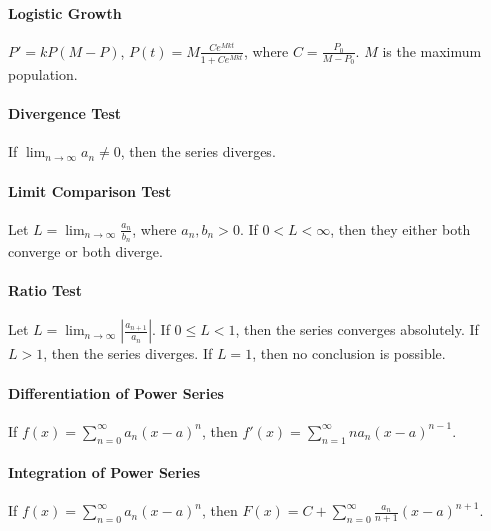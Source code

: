 \documentclass[10pt,letter]{article}
\begin{document}
\paragraph{Logistic Growth}
$P'=kP(M-P)$, $P(t)=M\frac{Ce^{Mkt}}{1+Ce^{Mkt}}$, where $C=\frac{P_0}{M-P_0}$. $M$ is the maximum population. 

\paragraph{Divergence Test}
If $\lim_{n\rightarrow\infty}a_n\neq0$, then the series diverges.

\paragraph{Limit Comparison Test}
Let $L=\lim_{n\rightarrow\infty}\frac{a_n}{b_n}$, where $a_n,b_n>0$. If $0<L<\infty$, then they either both converge or both diverge. 

\paragraph{Ratio Test}
Let $L=\lim_{n\rightarrow\infty}\left|\frac{a_{n+1}}{a_n}\right|$. If $0\leq L<1$, then the series converges absolutely. If $L>1$, then the series diverges. If $L=1$, then no conclusion is possible. 

\paragraph{Differentiation of Power Series}
If $f(x)=\sum_{n=0}^\infty a_n(x-a)^n$, then $f'(x)=\sum_{n=1}^\infty na_n(x-a)^{n-1}$. 

\paragraph{Integration of Power Series}
If $f(x)=\sum_{n=0}^\infty a_n(x-a)^n$, then $F(x)=C+\sum_{n=0}^\infty\frac{a_n}{n+1}(x-a)^{n+1}$. 
\end{document}
